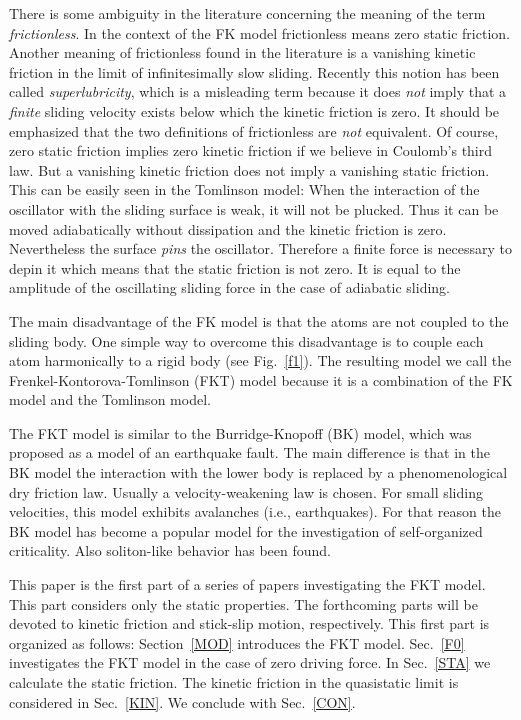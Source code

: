 There is some ambiguity in the literature concerning the meaning of
the term {\em frictionless\/}. In the context of the FK model
frictionless means zero static friction. Another meaning of
frictionless found in the literature is a vanishing kinetic friction
in the limit of infinitesimally slow sliding\cite{mcc.89}. Recently
this notion has been called {\em
superlubricity\/}\cite{shi.93,hir.93}, which is a misleading term
because it does {\em not\/} imply that a {\em finite\/} sliding
velocity exists below which the kinetic friction is zero. It should
be emphasized that the two definitions of frictionless are {\em
not\/} equivalent. Of course, zero static friction implies zero
kinetic friction if we believe in Coulomb's third law. But a
vanishing kinetic friction does not imply a vanishing static
friction.  This can be easily seen in the Tomlinson model: When the
interaction of the oscillator with the sliding surface is weak, it
will not be plucked. Thus it can be moved adiabatically without
dissipation and the kinetic friction is zero. Nevertheless the
surface {\em pins\/} the oscillator. Therefore a finite force is
necessary to depin it which means that the static friction is not
zero. It is equal to the amplitude of the oscillating sliding force
in the case of adiabatic sliding.

The main disadvantage of the FK model is that the atoms are not
coupled to the sliding body. One simple way to overcome this
disadvantage is to couple each atom harmonically to a rigid body (see
Fig.~\ref{f1}).  The resulting model we call the
Frenkel-Kontorova-Tomlinson (FKT) model because it is a combination
of the FK model and the Tomlinson model.

The FKT model is similar to the Burridge-Knopoff (BK)
model\cite{bur.67}, which was proposed as a model of an earthquake
fault. The main difference is that in the BK model the interaction
with the lower body is replaced by a phenomenological dry friction
law. Usually a velocity-weakening law is chosen\cite{car.89}. For
small sliding velocities, this model exhibits avalanches (i.e., 
earthquakes). For that reason the BK model has become a popular model
for the investigation of self-organized
criticality\cite{car.89,sor.92}. Also soliton-like behavior has been
found\cite{sch.93}. 

This paper is the first part of a series of papers investigating the
FKT model. This part considers only the static properties. The
forthcoming parts will be devoted to kinetic friction and stick-slip
motion, respectively. This first part is organized as follows: 
Section~\ref{MOD} introduces the FKT model. Sec.~\ref{F0}
investigates the FKT model in the case of zero driving force. In
Sec.~\ref{STA} we calculate the static friction. The kinetic friction
in the quasistatic limit is considered in Sec.~\ref{KIN}. We conclude
with Sec.~\ref{CON}.



